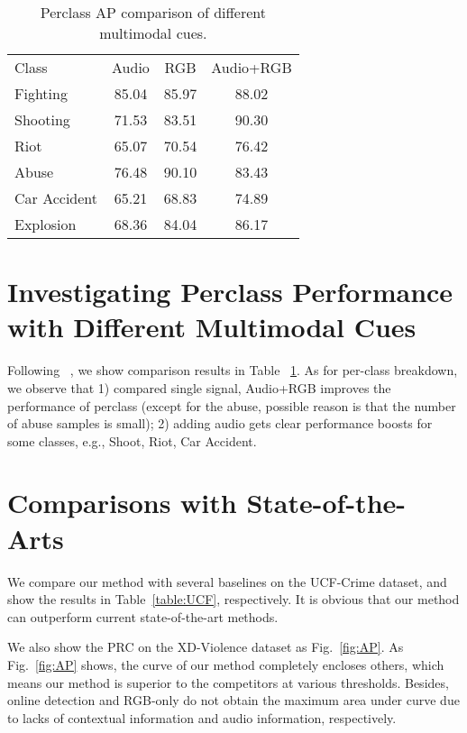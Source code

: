 \documentclass[runningheads]{llncs}
\begin{document}
\setlength{\tabcolsep}{4pt}
\begin{table}[t]
\begin{center}
\caption{Perclass AP comparison of different multimodal cues.}
\label{table:perclass}

\begin{tabular}{lccc}
\hline\noalign{\smallskip}
Class  &  Audio   &  RGB &   Audio+RGB \\
\noalign{\smallskip}
\hline
\noalign{\smallskip}
Fighting   & 85.04 & 85.97 & 88.02 \\
Shooting   & 71.53 & 83.51 & 90.30 \\
Riot    & 65.07 & 70.54 & 76.42 \\
Abuse    & 76.48 & 90.10 & 83.43 \\
Car Accident    & 65.21 & 68.83 & 74.89 \\
Explosion   & 68.36 & 84.04 & 86.17 \\
\hline
\end{tabular}
\end{center}
\end{table}

\section{Investigating Perclass Performance with Different Multimodal Cues}

Following ~\cite{zhu2019motion}, we show comparison results in Table ~\ref{table:perclass}. As for per-class breakdown, we observe that 1) compared single signal, Audio+RGB improves the performance of perclass (except for the abuse, possible reason is that the number of abuse samples is small); 2) adding audio gets clear performance boosts for some classes, e.g., Shoot, Riot, Car Accident.


\section{Comparisons with State-of-the-Arts}

We compare our method with several baselines on the UCF-Crime dataset, and show the results in Table~\ref{table:UCF}, respectively. It is obvious that our method can outperform current state-of-the-art methods.

We also show the PRC on the XD-Violence dataset as Fig.~\ref{fig:AP}. As Fig.~\ref{fig:AP} shows, the curve of our method completely encloses others, which means our method is superior to the competitors at various thresholds. Besides, online detection and RGB-only do not obtain the maximum area under curve due to lacks of contextual information and audio information, respectively.
\end{document}
